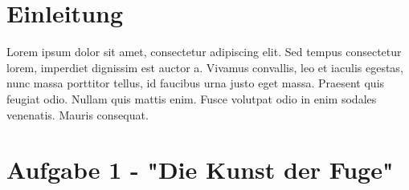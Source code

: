 \documentclass[a4paper,12pt]{article}			%
\begin{document}

\newpage 								%

\thispagestyle{empty}
\tableofcontents 						%


\setcounter{page}{1}					%


\newpage
\section{Einleitung}



Lorem ipsum dolor sit amet, consectetur adipiscing elit. Sed tempus consectetur lorem, imperdiet dignissim est auctor a. Vivamus convallis, leo et iaculis egestas, nunc massa porttitor tellus, id faucibus urna justo eget massa. Praesent quis feugiat odio. Nullam quis mattis enim. Fusce volutpat odio in enim sodales venenatis. Mauris consequat.


\newpage
\section{Aufgabe 1 - "Die Kunst der Fuge"}
\end{document}
